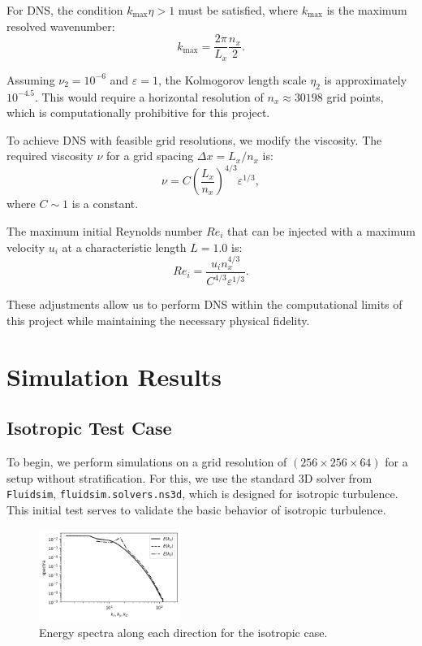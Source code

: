 \documentclass[final,5p,times,twocolumn,authoryear]{elsarticle}
\begin{document}
For DNS, the condition $k_{\text{max}} \eta > 1$ must be satisfied, where $k_{\text{max}}$ is the maximum resolved wavenumber:
\begin{equation*}
    k_{\text{max}} = \frac{2\pi}{L_x} \frac{n_x}{2}.
\end{equation*}

Assuming $\nu_2 = 10^{-6}$ and $\varepsilon = 1$, the Kolmogorov length scale $\eta_2$ is approximately $10^{-4.5}$. This would require a horizontal resolution of $n_x \approx 30198$ grid points, which is computationally prohibitive for this project.

To achieve DNS with feasible grid resolutions, we modify the viscosity. The required viscosity $\nu$ for a grid spacing $\Delta x = L_x / n_x$ is:
\begin{equation*}
    \nu = C \left(\frac{L_x}{n_x}\right)^{4/3} \varepsilon^{1/3},
\end{equation*}
where $C \sim 1$ is a constant. 

The maximum initial Reynolds number $Re_i$ that can be injected with a maximum velocity $u_i$ at a characteristic length $L=1.0$ is:
\begin{equation*}
    Re_i = \frac{u_i n_x^{4/3}}{C^{4/3} \varepsilon^{1/3}}.
\end{equation*}

These adjustments allow us to perform DNS within the computational limits of this project while maintaining the necessary physical fidelity.


\section{Simulation Results}
\subsection{Isotropic Test Case}

To begin, we perform simulations on a grid resolution of $(256 \times 256 \times 64)$ for a setup without stratification. For this, we use the standard 3D solver from \texttt{Fluidsim}, \texttt{fluidsim.solvers.ns3d}, which is designed for isotropic turbulence. This initial test serves to validate the basic behavior of isotropic turbulence.

\begin{figure}[h]
	\centering
	\includegraphics[width=0.41\textwidth]{fig/iso_spectra.png}
	\caption{Energy spectra along each direction for the isotropic case.} 
	\label{fig:iso spectra}
\end{figure}
\end{document}
